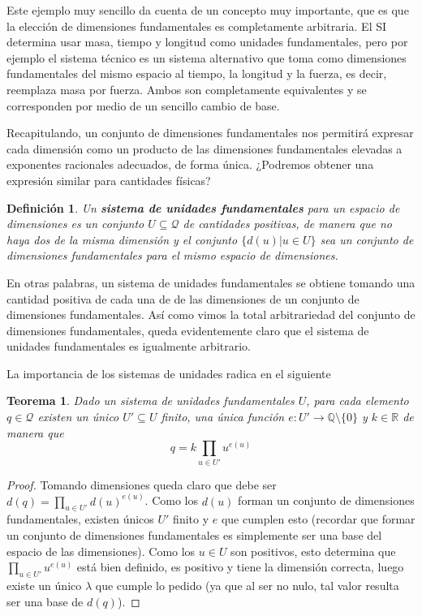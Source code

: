 \documentclass{article}
\def\Quantities{\mathcal Q}
\newtheorem{teorema}{{\sc Teorema}}
\newtheorem{definicion}{{\sc Definición}}
\begin{document}
Este ejemplo muy sencillo da cuenta de un concepto muy importante, que es que la elección de dimensiones fundamentales
es completamente arbitraria. El SI determina usar masa, tiempo y longitud como unidades fundamentales, pero por ejemplo
el sistema técnico es un sistema alternativo que toma como dimensiones fundamentales del mismo espacio al tiempo,
la longitud y la fuerza, es decir, reemplaza masa por fuerza. Ambos son completamente equivalentes y se corresponden
por medio de un sencillo cambio de base.

Recapitulando, un conjunto de dimensiones fundamentales nos permitirá expresar cada dimensión como un producto de las dimensiones
fundamentales elevadas a exponentes racionales adecuados, de forma única. ¿Podremos obtener una expresión similar para cantidades
físicas?

\begin{definicion}
Un \textbf{sistema de unidades fundamentales} para un espacio de dimensiones es un conjunto $U \subseteq \Quantities$ de cantidades positivas, de manera que
no haya dos de la misma dimensión y el conjunto $\{d(u) | u \in U \}$ sea un conjunto de dimensiones fundamentales para el mismo espacio
de dimensiones.
\end{definicion}

En otras palabras, un sistema de unidades fundamentales se obtiene tomando una cantidad positiva de cada una de de las dimensiones
de un conjunto de dimensiones fundamentales. Así como vimos la total arbitrariedad del conjunto de dimensiones fundamentales,
queda evidentemente claro que el sistema de unidades fundamentales es igualmente arbitrario. 

La importancia de los sistemas de unidades radica en el siguiente

\begin{teorema}
Dado un sistema de unidades fundamentales $U$, para cada elemento $q \in \Quantities$ existen un único $U' \subseteq U$ finito,
una única función $e : U' \rightarrow \mathbb{Q} \setminus \{0\}$ y $k \in \mathbb{R}$ de manera que
$$q = k \prod_{u \in U'}{u^{e(u)}}$$
\end{teorema}

\begin{proof}
Tomando dimensiones queda claro que debe ser $d(q) = \prod_{u \in U'}{d(u)^{e(u)}}$. Como los $d(u)$ forman un conjunto de 
dimensiones fundamentales, existen únicos $U'$ finito y $e$ que cumplen esto (recordar que formar un conjunto de dimensiones
fundamentales es simplemente ser una base del espacio de las dimensiones). Como los $u \in U$ son positivos, esto determina
que $\prod_{u \in U'}{u^{e(u)}}$ está bien definido, es positivo y tiene la dimensión correcta, luego existe un único
$\lambda$ que cumple lo pedido (ya que al ser no nulo, tal valor resulta ser una base de $d(q)$).
\end{proof}
\end{document}
